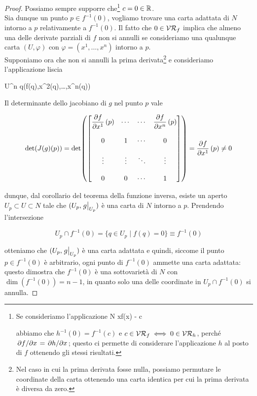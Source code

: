 \begin{proof}
	Possiamo sempre supporre che\footnote{%
		Se consideriamo l'applicazione
			{N}{\R}
			{x}{f(x) - c}
		
		abbiamo che $ h^{-1}(0) = f^{-1}(c) $ e $ c \in \mathcal{VR}_{f} \iff 0 \in \mathcal{VR}_{h} $, perché $ \pdv*{f}{x} = \pdv*{h}{x} $; questo ci permette di considerare l'applicazione $ h $ al posto di $ f $ ottenendo gli stessi risultati.%
	} $ c = 0 \in \mathbb{R} $. \\
	Sia dunque un punto $ p \in f^{-1}(0) $, vogliamo trovare una carta adattata di $ N $ intorno a $ p $ relativamente a $ f^{-1}(0) $. Il fatto che $ 0 \in \mathcal{VR}_{f} $ implica che almeno una delle derivate parziali di $ f $ non si annulli se consideriamo una qualunque carta $ (U,\varphi) $ con $ \varphi = (x^{1},\dots,x^{n}) $ intorno a $ p $. \\
	Supponiamo ora che non si annulli la prima derivata\footnote{%
		Nel caso in cui la prima derivata fosse nulla, possiamo permutare le coordinate della carta ottenendo una carta identica per cui la prima derivata è diversa da zero.%
	} e consideriamo l'applicazione liscia

		{U}{\R^{n}}
		{q}{(f(q),x^{2}(q),\dots,x^{n}(q))}

	Il determinante dello jacobiano di $ g $ nel punto $ p $ vale

	\begin{equation}
		\det(J(g)(p)) = \det( \bmqty{ %
			\dpdv{f}{x^{1}} \, (p) & \cdots & \cdots & \dpdv{f}{x^{n}} \, (p) \\ \\ %
			0 & 1 & \cdots & 0 \\ \\ %
			\vdots & \vdots & \ddots & \vdots \\ \\ %
			0 & 0 & \cdots & 1
			} ) %
		= \dpdv{f}{x^{1}} \, (p) \neq 0
	\end{equation}

	dunque, dal corollario del teorema della funzione inversa, esiste un aperto $ U_{p} \subset U \subset N $ tale che $ (U_{p},\eval{g}_{U_{p}}) $ è una carta di $ N $ intorno a $ p $. Prendendo l'intersezione
	
	\begin{equation}
		U_{p} \cap f^{-1}(0) = \{ q \in U_{p} \mid f(q)=0 \} \equiv f^{-1}(0)
	\end{equation}

	otteniamo che $ (U_{p},\eval{g}_{U_{p}}) $ è una carta adattata e quindi, siccome il punto $ p \in f^{-1}(0) $ è arbitrario, ogni punto di $ f^{-1}(0) $ ammette una carta adattata: questo dimostra che $ f^{-1}(0) $ è una sottovarietà di $ N $ con $ \dim(f^{-1}(0)) = n-1 $, in quanto solo una delle coordinate in $ U_{p} \cap f^{-1}(0) $ si annulla.
\end{proof}


